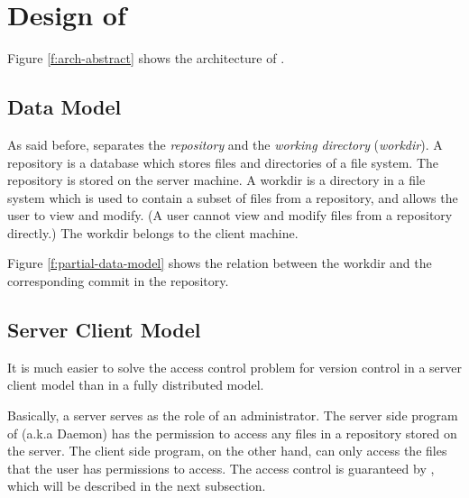 \section{Design of \sys}
\label{s:design}



Figure \ref{f:arch-abstract}  shows the architecture of \sys.

\subsection{Data Model}

As said before, \sys separates the \emph{repository} and the \emph{working
directory} (\emph{workdir}). A repository is a database which stores files
and directories of a file system. The repository is stored on the server
machine. A workdir is a directory in a file system which is used to
contain a subset of files from a repository, and allows the user to view and
modify. (A user cannot view and modify files from a repository directly.) The
workdir belongs to the client machine.



Figure \ref{f:partial-data-model} shows the relation between the workdir and the
corresponding commit in the repository. 

\subsection{Server Client Model}

It is much easier to solve the access control problem for version control in a
server client model than in a fully distributed model. 

Basically, a server serves as the role of an administrator. The server side
program of \sys (a.k.a \Sys Daemon) has the permission to access any files in a
repository stored on the server. The client side program, on the other hand, can
only access the files that the user has permissions to access.  The access control is
guaranteed by \sys, which will be described in the next subsection.

